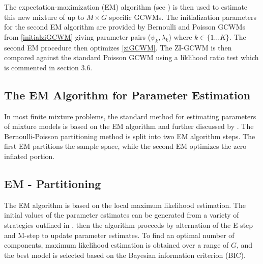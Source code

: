 \documentclass[11pt,letterpaper]{article}
\numberwithin{equation}{section}
\numberwithin{equation}{section}
\numberwithin{equation}{section}
\begin{document}
The expectation-maximization (EM) algorithm (see \cite{Dempster+Laird+Rubin:1977}) is then used to estimate this new mixture of up to $M \times G$ specific GCWMs. The initialization parameters for the second EM algorithm are provided by Bernoulli and Poisson GCWMs from \eqref{initialziGCWM} giving parameter pairs ($ \psi_k,\lambda_k  $) where $k \in \{1 \dots K \} $. The second EM procedure then optimizes \eqref{ziGCWM}. The ZI-GCWM is then compared against the standard Poisson GCWM using a liklihood ratio test which is commented in section 3.6. 

\subsection{The EM Algorithm for Parameter Estimation}
In most finite mixture problems, the standard method for estimating parameters of mixture models is based on the EM algorithm and further discussed by \cite{McLachlan+Peel:2000}.
The Bernoulli-Poisson partitioning method is split into two EM algorithm steps. The first EM partitions the sample space, while the second EM optimizes the zero inflated portion. 
 \subsection{EM - Partitioning}
 
The EM algorithm is based on the local  maximum likelihood estimation. %
The initial values of the parameter estimates can be generated from a variety of strategies outlined in \cite{initialPaperGrassiaRef}, %
then the algorithm proceeds by alternation of the E-step and M-step to update parameter estimates. %
To find an optimal number of components, maximum likelihood estimation is obtained over a range of $G$, and the best model is selected based on the Bayesian information criterion (BIC).   %
\end{document}
